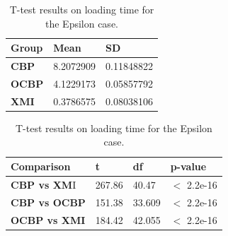 \documentclass{llncs}
\begin{document}
\begin{table}[ht]
    \centering
    \label{table:ttest_load_time_epsilon}
    \caption{T-test results on loading time for the Epsilon case.}
    \begin{minipage}{0.44\textwidth}
        \centering
        \begin{tabular}{|p{}|p{}|p{}|}
            \hline 
            \textbf{Group}  & \textbf{Mean} & \textbf{SD} \\ 
            \hline 
            \textbf{CBP} & 8.2072909    & 0.11848822 \\ 
            \hline 
            \textbf{OCBP} &  4.1229173  &  0.05857792 \\ 
            \hline 
            \textbf{XMI} & 0.3786575   & 0.08038106 \\ 
            \hline 
        \end{tabular} 
    \end{minipage}
    \hfill
    \begin{minipage}{0.54\textwidth}
        \centering
     \begin{tabular}{|p{}|p{}|p{}|p{}|}
            \hline 
            \textbf{Comparison} & \textbf{t}  & \textbf{df} & \textbf{p-value} \\ 
            \hline 
            \textbf{CBP vs XM}I & 267.86   &40.47 & $<$ 2.2e-16 \\ 
            \hline 
            \textbf{CBP vs OCBP} & 151.38 & 33.609 & $<$ 2.2e-16 \\ 
            \hline 
            \textbf{OCBP vs XMI} & 184.42    &42.055  & $<$ 2.2e-16 \\ 
            \hline 
        \end{tabular} 
    \end{minipage}
\end{table}
\end{document}
